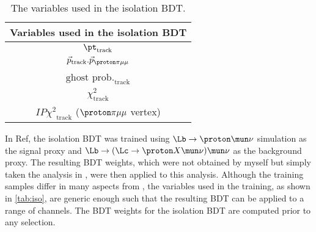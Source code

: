 \begin{table}[h!]
  
  \centering
  \begin{tabular}{c}

    \hline
    Variables used in the isolation BDT\\
    \hline
    $\pt_{\mathrm{track}}$\\
    $\vec{p}_{\mathrm{track}}.\vec{p}_{\proton\pi\mu\mu}$\\ %
    $\mathrm{ghost}$ $\mathrm{prob.}_{\mathrm{track}}$\\
    $\chi^{2}_{\mathrm{track}}$ \\
    $IP{\chi^{2}}_{\mathrm{track}}$ ($\proton\pi\mu\mu$ vertex)\\
    \hline
  \end{tabular}
  \caption{The variables used in the isolation BDT.}
  \label{tab:iso}
\end{table}

In Ref\cite{LHCB-ANA-2014-048}, the isolation BDT was trained using $\Lb\to\proton\mun\nu$ simulation as the signal proxy and $\Lb\to(\Lc\to \proton X\mun\nu)\mun\nu$ as the background proxy. The resulting BDT weights, which were not obtained by myself but simply taken the analysis in \cite{LHCB-ANA-2014-048}, were then applied to this analysis. Although the training samples differ in many aspects from \Lbpi, the variables used in the training, as shown in \autoref{tab:iso}, are generic enough such that the resulting BDT can be applied to a range of channels. The BDT weights for the isolation BDT are computed prior to any selection.%
